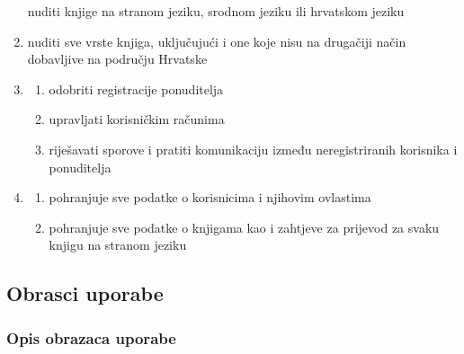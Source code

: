 \begin{enumerate}
	nuditi knjige na stranom jeziku, srodnom jeziku ili hrvatskom jeziku
	
	
	\item {}
	
	nuditi sve vrste knjiga, uključujući i one koje nisu na drugačiji način dobavljive na području
	Hrvatske
	
	\item {}
	\begin{enumerate}
		\item odobriti registracije ponuditelja
		\item upravljati korisničkim računima
		\item riješavati sporove i pratiti komunikaciju između neregistriranih korisnika i ponuditelja
	\end{enumerate}
		
	\item {}
	
	\begin{enumerate}
		
		\item pohranjuje sve podatke o korisnicima i njihovim ovlastima
		
		\item pohranjuje sve podatke o knjigama kao i zahtjeve za prijevod za svaku knjigu na stranom jeziku
		
	\end{enumerate}
	
\end{enumerate}

\eject 



\subsection{Obrasci uporabe}

\subsubsection{Opis obrazaca uporabe}

